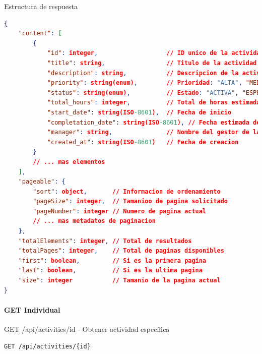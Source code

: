 \documentclass[11pt,a4paper]{article}
\begin{document}
\begin{center}
	\begin{minipage}{\textwidth}
		\begin{codebox}{Estructura de respuesta}
			\begin{lstlisting}[language=json]
{
    "content": [
        {
            "id": integer,                   // ID unico de la actividad
            "title": string,                 // Titulo de la actividad
            "description": string,           // Descripcion de la actividad
            "priority": string(enum),        // Prioridad: "ALTA", "MEDIA", "BAJA"
            "status": string(enum),          // Estado: "ACTIVA", "ESPERA", "COMPLETADA", "CANCELADA"
            "total_hours": integer,          // Total de horas estimadas
            "start_date": string(ISO-8601),  // Fecha de inicio
            "completation_date": string(ISO-8601), // Fecha estimada de finalizacion
            "manager": string,               // Nombre del gestor de la actividad
            "created_at": string(ISO-8601)   // Fecha de creacion
        }
        // ... mas elementos
    ],
    "pageable": {
        "sort": object,       // Informacion de ordenamiento
        "pageSize": integer,  // Tamanioo de pagina solicitado
        "pageNumber": integer // Numero de pagina actual
        // ... mas metadatos de paginacion
    },
    "totalElements": integer, // Total de resultados
    "totalPages": integer,    // Total de paginas disponibles
    "first": boolean,         // Si es la primera pagina
    "last": boolean,          // Si es la ultima pagina
    "size": integer           // Tamanio de la pagina actual
}
\end{lstlisting}
		\end{codebox}
	\end{minipage}
\end{center}

\paragraph{GET Individual}

\begin{center}
	\begin{minipage}{\textwidth}
		\begin{codebox}{GET /api/activities/{id} - Obtener actividad específica}
			\begin{lstlisting}[language=HTTP]
GET /api/activities/{id}
\end{lstlisting}
		\end{codebox}
	\end{minipage}
\end{center}
\end{document}
